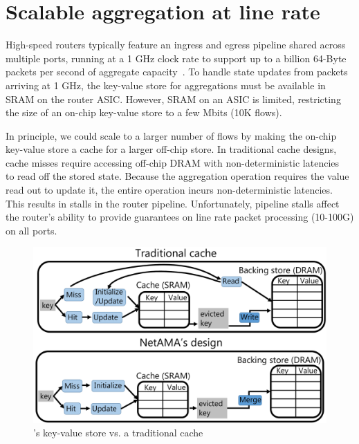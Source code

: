 \section{Scalable aggregation at line rate}
\label{sec:aggregation}
 High-speed routers typically feature an ingress and egress pipeline shared
across multiple ports, running at a 1 GHz clock rate to support up to a billion
64-Byte
packets per second of aggregate capacity~\cite{rmt}.  To handle state updates
from packets arriving at 1 GHz, the key-value store for aggregations must be
available in SRAM on the router ASIC.  However, SRAM on an ASIC is limited,
restricting the size of an on-chip key-value store to a few Mbits (10K flows).

In principle, we could scale to a larger number of flows by making the on-chip
key-value store a cache for a larger off-chip store. In traditional cache
designs, cache misses require accessing off-chip DRAM with non-deterministic
latencies~\cite{unpredictable_cache} to read off the stored state. Because the
aggregation operation requires the value read out to update it, the
entire operation incurs
non-deterministic latencies. This results in stalls in the router
pipeline. Unfortunately, pipeline stalls affect the router's ability to provide
guarantees on line rate packet processing (10-100G) on all ports.

\begin{figure}
\centering
\includegraphics[width=0.6\columnwidth]{pq_kv_store.pdf}
\caption{\TheSystem's key-value store vs. a traditional cache}
\label{fig:kv}
\end{figure}

